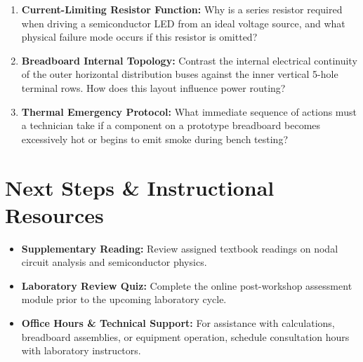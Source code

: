 \begin{enumerate}[leftmargin=1.8em]
    \item \textbf{Current-Limiting Resistor Function:} Why is a series resistor required when driving a semiconductor LED from an ideal voltage source, and what physical failure mode occurs if this resistor is omitted?
    \item \textbf{Breadboard Internal Topology:} Contrast the internal electrical continuity of the outer horizontal distribution buses against the inner vertical 5-hole terminal rows. How does this layout influence power routing?
    \item \textbf{Thermal Emergency Protocol:} What immediate sequence of actions must a technician take if a component on a prototype breadboard becomes excessively hot or begins to emit smoke during bench testing?
\end{enumerate}

\section{Next Steps \& Instructional Resources}
\begin{itemize}[leftmargin=1.5em]
    \item \textbf{Supplementary Reading:} Review assigned textbook readings on nodal circuit analysis and semiconductor physics.
    \item \textbf{Laboratory Review Quiz:} Complete the online post-workshop assessment module prior to the upcoming laboratory cycle.
    \item \textbf{Office Hours \& Technical Support:} For assistance with calculations, breadboard assemblies, or equipment operation, schedule consultation hours with laboratory instructors.
\end{itemize}

